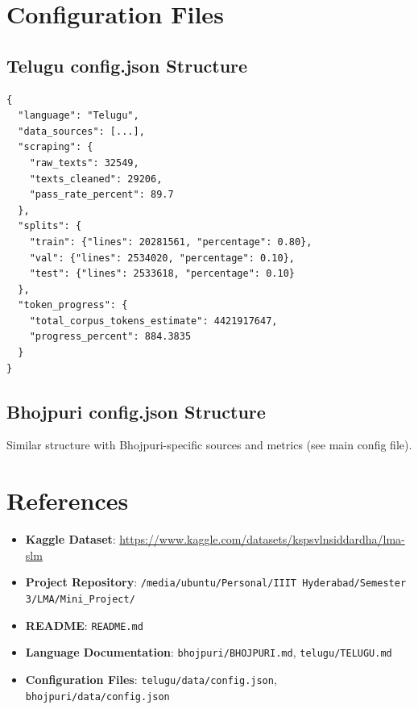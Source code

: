 \documentclass[11pt,a4paper]{article}
\begin{document}
\appendix

\section{Configuration Files}

\subsection{Telugu config.json Structure}

\begin{small}
\begin{verbatim}
{
  "language": "Telugu",
  "data_sources": [...],
  "scraping": {
    "raw_texts": 32549,
    "texts_cleaned": 29206,
    "pass_rate_percent": 89.7
  },
  "splits": {
    "train": {"lines": 20281561, "percentage": 0.80},
    "val": {"lines": 2534020, "percentage": 0.10},
    "test": {"lines": 2533618, "percentage": 0.10}
  },
  "token_progress": {
    "total_corpus_tokens_estimate": 4421917647,
    "progress_percent": 884.3835
  }
}
\end{verbatim}
\end{small}

\subsection{Bhojpuri config.json Structure}

Similar structure with Bhojpuri-specific sources and metrics (see main config file).

\section{References}

\small
\begin{itemize}
    \item \textbf{Kaggle Dataset}: \url{https://www.kaggle.com/datasets/kspsvlnsiddardha/lma-slm}
    \item \textbf{Project Repository}: \texttt{/media/ubuntu/Personal/IIIT Hyderabad/Semester 3/LMA/Mini\_Project/}
    \item \textbf{README}: \texttt{README.md}
    \item \textbf{Language Documentation}: \texttt{bhojpuri/BHOJPURI.md}, \texttt{telugu/TELUGU.md}
    \item \textbf{Configuration Files}: \texttt{telugu/data/config.json}, \texttt{bhojpuri/data/config.json}
\end{itemize}
\normalsize
\end{document}
